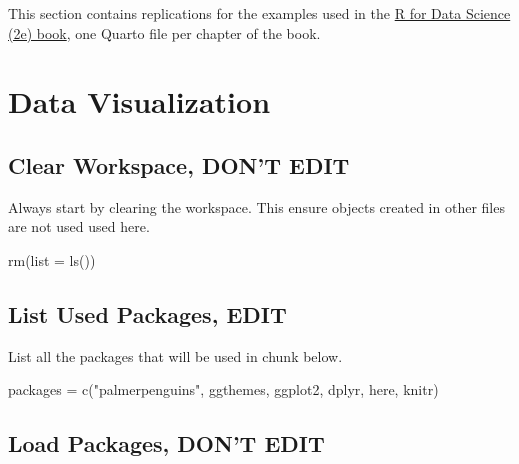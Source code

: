 \documentclass[
  letterpaper,
  DIV=11,
  numbers=noendperiod]{scrreprt}
\newenvironment{Shaded}{\begin{snugshade}}{\end{snugshade}}
\newcommand{\AttributeTok}[1]{\textcolor[rgb]{0.40,0.45,0.13}{#1}}
\newcommand{\FunctionTok}[1]{\textcolor[rgb]{0.28,0.35,0.67}{#1}}
\newcommand{\NormalTok}[1]{\textcolor[rgb]{0.00,0.23,0.31}{#1}}
\newcommand{\OtherTok}[1]{\textcolor[rgb]{0.00,0.23,0.31}{#1}}
\newcommand{\StringTok}[1]{\textcolor[rgb]{0.13,0.47,0.30}{#1}}
\begin{document}
This section contains replications for the examples used in the
\href{https://r4ds.hadley.nz/}{R for Data Science (2e) book}, one Quarto
file per chapter of the book.

\chapter{Data Visualization}\label{data-visualization}

\section*{Clear Workspace, DON'T
EDIT}\label{clear-workspace-dont-edit-2}


Always start by clearing the workspace. This ensure objects created in
other files are not used used here.

\begin{Shaded}
\begin{Highlighting}[]
\FunctionTok{rm}\NormalTok{(}\AttributeTok{list =} \FunctionTok{ls}\NormalTok{())}
\end{Highlighting}
\end{Shaded}

\section*{List Used Packages, EDIT}\label{list-used-packages-edit-2}


List all the packages that will be used in chunk below.

\begin{Shaded}
\begin{Highlighting}[]
\NormalTok{packages }\OtherTok{=} \FunctionTok{c}\NormalTok{(}\StringTok{"palmerpenguins"}\NormalTok{, }\StringTok{\textquotesingle{}ggthemes\textquotesingle{}}\NormalTok{, }\StringTok{\textquotesingle{}ggplot2\textquotesingle{}}\NormalTok{, }\StringTok{\textquotesingle{}dplyr\textquotesingle{}}\NormalTok{, }\StringTok{\textquotesingle{}here\textquotesingle{}}\NormalTok{, }\StringTok{\textquotesingle{}knitr\textquotesingle{}}\NormalTok{)}
\end{Highlighting}
\end{Shaded}

\section*{Load Packages, DON'T EDIT}\label{sec-packages}
\end{document}
